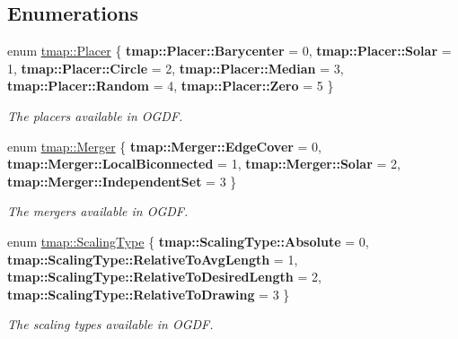 \subsection*{Enumerations}
\begin{DoxyCompactItemize}
\item 
\mbox{\label{layout_8hh_afdc98947e81dc6f4c30f256e6f42f90b}} 
enum \hyperlink{layout_8hh_afdc98947e81dc6f4c30f256e6f42f90b}{tmap\+::\+Placer} \{ \newline
{\bfseries tmap\+::\+Placer\+::\+Barycenter} = 0, 
{\bfseries tmap\+::\+Placer\+::\+Solar} = 1, 
{\bfseries tmap\+::\+Placer\+::\+Circle} = 2, 
{\bfseries tmap\+::\+Placer\+::\+Median} = 3, 
\newline
{\bfseries tmap\+::\+Placer\+::\+Random} = 4, 
{\bfseries tmap\+::\+Placer\+::\+Zero} = 5
 \}\begin{DoxyCompactList}\small\item\em The placers available in O\+G\+DF. \end{DoxyCompactList}
\item 
\mbox{\label{layout_8hh_a8c7bb9956a1a724233182a166cfdc0ff}} 
enum \hyperlink{layout_8hh_a8c7bb9956a1a724233182a166cfdc0ff}{tmap\+::\+Merger} \{ {\bfseries tmap\+::\+Merger\+::\+Edge\+Cover} = 0, 
{\bfseries tmap\+::\+Merger\+::\+Local\+Biconnected} = 1, 
{\bfseries tmap\+::\+Merger\+::\+Solar} = 2, 
{\bfseries tmap\+::\+Merger\+::\+Independent\+Set} = 3
 \}\begin{DoxyCompactList}\small\item\em The mergers available in O\+G\+DF. \end{DoxyCompactList}
\item 
\mbox{\label{layout_8hh_a50ec215c9e54cf12b9dd0a0056160761}} 
enum \hyperlink{layout_8hh_a50ec215c9e54cf12b9dd0a0056160761}{tmap\+::\+Scaling\+Type} \{ {\bfseries tmap\+::\+Scaling\+Type\+::\+Absolute} = 0, 
{\bfseries tmap\+::\+Scaling\+Type\+::\+Relative\+To\+Avg\+Length} = 1, 
{\bfseries tmap\+::\+Scaling\+Type\+::\+Relative\+To\+Desired\+Length} = 2, 
{\bfseries tmap\+::\+Scaling\+Type\+::\+Relative\+To\+Drawing} = 3
 \}\begin{DoxyCompactList}\small\item\em The scaling types available in O\+G\+DF. \end{DoxyCompactList}
\end{DoxyCompactItemize}
